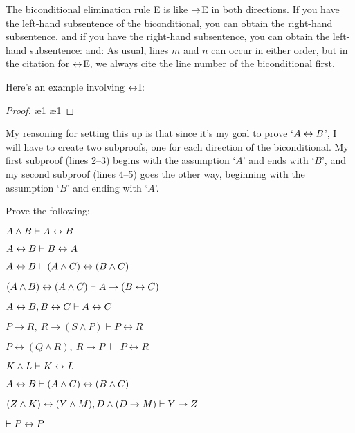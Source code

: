 The biconditional elimination rule {\eiff}E is like $\rightarrow$E in both directions. If you have the left-hand subsentence of the biconditional, you can obtain the right-hand subsentence, and if you have the right-hand subsentence, you can obtain the left-hand subsentence:
and:
As usual, lines $m$ and $n$ can occur in either order, but in the citation for $\leftrightarrow$E, we always cite the line number of the biconditional first.

Here's an example involving $\leftrightarrow$I:


\begin{proof}
 
\open
{}  
 \ae{1}
\close
\open
{} 
 \ae{1}
\close
{} 
\end{proof}
My reasoning for setting this up is that since it's my goal to prove `$A \leftrightarrow B$', I will have to create two subproofs, one for each direction of the biconditional. My first subproof (lines 2--3) begins with the assumption `$A$' and ends with `$B$', and my second subproof (lines 4--5) goes the other way, beginning with the assumption `$B$' and ending with `$A$'.

\practiceproblems

\problempart
Prove the following:

\begin{earg}
\item $A \wedge B \vdash A \leftrightarrow B$
\item $A \leftrightarrow B \vdash B \leftrightarrow A$
\item $A \leftrightarrow B \vdash (A \wedge C) \leftrightarrow (B \wedge C)$
\item $(A \wedge B) \leftrightarrow (A \wedge C) \vdash A \rightarrow (B \leftrightarrow C)$
\item $A\leftrightarrow B, B\leftrightarrow C \vdash A\leftrightarrow C$
\item $P \rightarrow R,  \ R\rightarrow (S \land P) \vdash P \leftrightarrow R$
\item $P \leftrightarrow (Q \land R), \ R \rightarrow P  \ \vdash \ P \leftrightarrow R$
\item $K \wedge L \vdash K \leftrightarrow L$
\item $A \leftrightarrow B \vdash (A \wedge C) \leftrightarrow (B \wedge C)$
\item $(Z\wedge K)\leftrightarrow(Y\wedge M), D\wedge(D\rightarrow M) \vdash Y\rightarrow Z$
\item $\vdash P \leftrightarrow P$
\end{earg}





